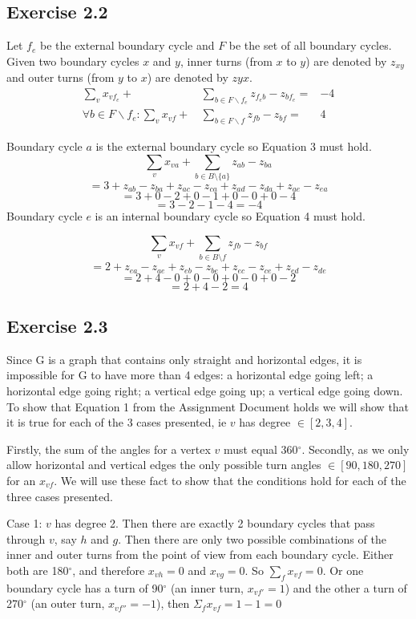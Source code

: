 \subsection{Exercise 2.2}
Let \(f_e\) be the external boundary cycle and \(F\) be the set of all boundary cycles. Given two boundary cycles \(x\) and \(y\), inner turns (from \(x\) to \(y\)) are denoted by \(z_{xy}\) and outer turns (from \(y\) to \(x\)) are denoted by \(z{yx}\).
\begin{align}
  \sum_{v} x_{vf_{e}} +&\, \sum_{b\in F \backslash {f_e}} z_{f_{e}b} - z_{bf_{e}} =& -4\\
  \forall b \in F \backslash {f_e}:\sum_{v} x_{vf} +&\, \sum_{b\in F \backslash {f}} z_{fb} - z_{bf} =& 4
\end{align}

Boundary cycle \(a\) is the external boundary cycle so Equation 3 must hold.
\[ \sum_{v} x_{v a} + \sum_{b\in B\setminus \{a\}} z_{a b} - z_{b a} \]
\[=  3 + z_{ab} - z_{ba} + z_{ac} - z_{ca} + z_{ad} - z_{da} + z_{ae} - z_{ea} \]
  \[=  3 + 0 - 2 + 0 - 1 + 0 - 0 + 0 - 4 \]
  \[=  3 - 2 - 1 - 4 = -4\]
Boundary cycle \(e\) is an internal boundary cycle so Equation 4 must hold.

  \[ \sum_{v} x_{vf} + \sum_{b\in B\setminus f} z_{fb} - z_{bf} \]
  \[= 2 + z_{ea} - z_{ae} + z_{eb} - z_{be} + z_{ec} - z_{ce} + z_{ed} - z_{de} \]
 \[= 2 + 4 - 0 + 0 - 0 + 0 - 0 + 0 - 2 \]
 \[= 2 + 4 - 2 = 4 \]

\subsection{Exercise 2.3}
Since G is a graph that contains only straight and horizontal edges, it is impossible for G to have more than 4 edges: a horizontal edge going left; a horizontal edge going right; a vertical edge going up; a vertical edge going down. To show that Equation 1 from the Assignment Document holds we will show that it is true for each of the 3 cases presented, ie \(v\) has degree \(\in [2,3,4]\).

Firstly, the sum of the angles for a vertex \(v\) must equal 360\(^\circ\). Secondly, as we only allow horizontal and vertical edges the only possible turn angles \(\in [90,180,270] \) for an \(x_{vf}\). We will use these fact to show that the conditions hold for each of the three cases presented.

Case 1: \(v\) has degree 2.\newline
Then there are exactly 2 boundary cycles that pass through \(v\), say \(h\) and \(g\). Then there are only two possible combinations of the inner and outer turns from the point of view from each boundary cycle. Either both are 180\(^\circ\), and therefore \( x_{vh} = 0 \) and  \( x_{vg} = 0 \). So \(\sum_f x_{vf} = 0 \). Or one boundary cycle has a turn of 90\(^\circ\) (an inner turn, \(x_{vf'} = 1\)) and the other a turn of 270\(^\circ\) (an outer turn,  \(x_{vf''} = -1\)), then \(\Sigma_f x_{vf} = 1 - 1 = 0 \)


